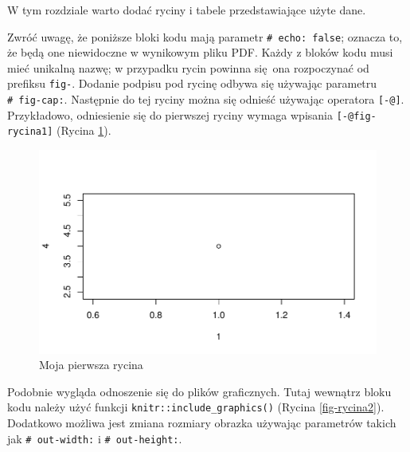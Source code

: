 \documentclass{amuthesis}
\begin{document}
W tym rozdziale warto dodać ryciny i tabele przedstawiające użyte dane.

Zwróć uwagę, że poniższe bloki kodu mają parametr
\texttt{\#\textbar{}\ echo:\ false}; oznacza to, że będą one niewidoczne
w wynikowym pliku PDF. Każdy z bloków kodu musi mieć unikalną nazwę; w
przypadku rycin powinna się~ona rozpoczynać od prefiksu \texttt{fig-}.
Dodanie podpisu pod rycinę odbywa się używając parametru
\texttt{\#\textbar{}\ fig-cap:}. Następnie do tej ryciny można się
odnieść używając operatora \texttt{{[}-@{]}}. Przykładowo, odniesienie
się do pierwszej ryciny wymaga wpisania \texttt{{[}-@fig-rycina1{]}}
(Rycina \ref{fig-rycina1}).

\begin{figure}[t]

{\centering \includegraphics{./03-roz3_files/figure-pdf/fig-rycina1-1.pdf}

}

\caption{\label{fig-rycina1}Moja pierwsza rycina}

\end{figure}

Podobnie wygląda odnoszenie się do plików graficznych. Tutaj wewnątrz
bloku kodu należy użyć funkcji \texttt{knitr::include\_graphics()}
(Rycina \ref{fig-rycina2}). Dodatkowo możliwa jest zmiana rozmiary
obrazka używając parametrów takich jak \texttt{\#\textbar{}\ out-width:}
i \texttt{\#\textbar{}\ out-height:}.
\end{document}
